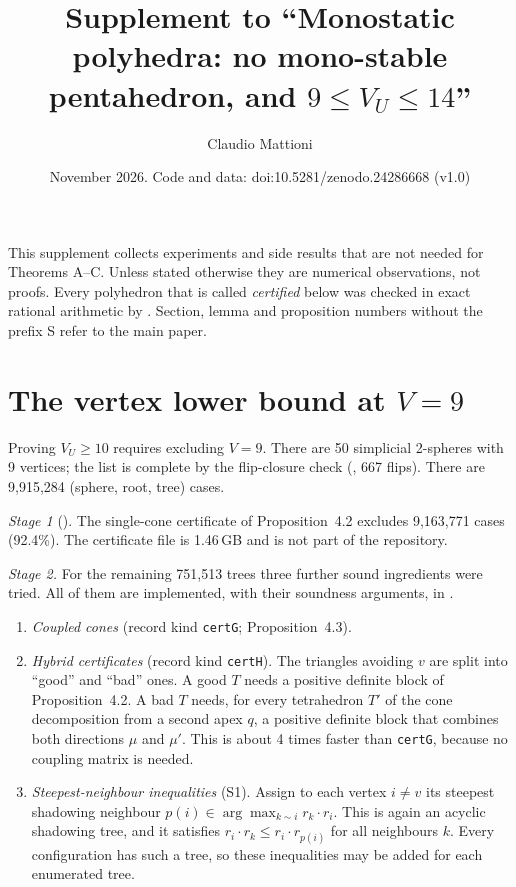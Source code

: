 \documentclass[11pt]{amsart}
\title{Supplement to ``Monostatic polyhedra: no mono-stable pentahedron, and \texorpdfstring{$9\le V_U\le14$}{9 <= V\_U <= 14}''}
\author{Claudio Mattioni}
\date{November 2026. Code and data: doi:10.5281/zenodo.24286668 (v1.0)}
\begin{document}
\maketitle

This supplement collects experiments and side results that are not needed for Theorems A--C. Unless stated
otherwise they are numerical observations, not proofs. Every polyhedron that is called \emph{certified}
below was checked in exact rational arithmetic by . Section, lemma and
proposition numbers without the prefix S refer to the main paper.

\section{The vertex lower bound at \texorpdfstring{$V=9$}{V = 9}}

Proving $V_U\ge10$ requires excluding $V=9$. There are 50 simplicial 2-spheres with 9 vertices; the list
is complete by the flip-closure check (, 667 flips). There are 9,915,284
(sphere, root, tree) cases.

\emph{Stage 1} (). The single-cone certificate of Proposition~4.2 excludes
9,163,771 cases (92.4\%). The certificate file is 1.46\,GB and is not part of the repository.

\emph{Stage 2.} For the remaining 751,513 trees three further sound ingredients were tried. All of them are
implemented, with their soundness arguments, in .
\begin{enumerate}
\item \emph{Coupled cones} (record kind \texttt{certG}; Proposition~4.3).
\item \emph{Hybrid certificates} (record kind \texttt{certH}). The triangles avoiding $v$ are split into
  ``good'' and ``bad'' ones. A good $T$ needs a positive definite block of Proposition~4.2. A bad $T$
  needs, for every tetrahedron $T'$ of the cone decomposition from a second apex $q$, a positive definite
  block that combines both directions $\mu$ and $\mu'$. This is about 4 times faster than \texttt{certG},
  because no coupling matrix is needed.
\item \emph{Steepest-neighbour inequalities} (S1). Assign to each vertex $i\ne v$ its steepest shadowing
  neighbour $p(i)\in\arg\max_{k\sim i}r_k\cdot r_i$. This is again an acyclic shadowing tree, and it
  satisfies $r_i\cdot r_k\le r_i\cdot r_{p(i)}$ for all neighbours $k$. Every configuration has such a tree,
  so these inequalities may be added for each enumerated tree.
\end{enumerate}
\end{document}
